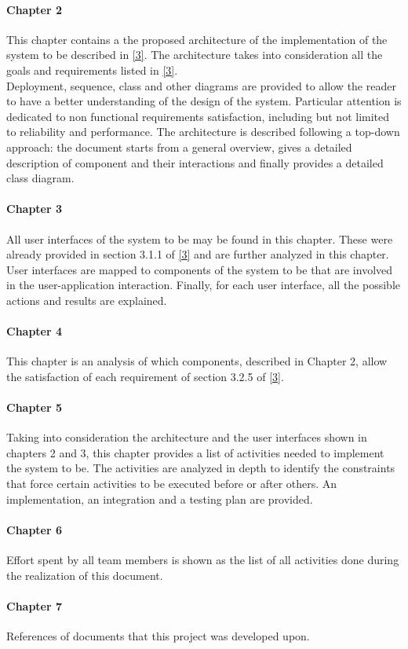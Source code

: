 \documentclass[../DD.tex]{subfiles}
\begin{document}
		\paragraph{Chapter 2}
			This chapter contains a the proposed architecture of the implementation of the system to be described in \hyperref[ref:3]{[3]}. The architecture takes into consideration all the goals and requirements listed in \hyperref[ref:3]{[3]}.\\
			Deployment, sequence, class and other diagrams are provided to allow the reader to have a better understanding of the design of the system. Particular attention is dedicated to non functional requirements satisfaction, including but not limited to reliability and performance. The architecture is described following a top-down approach: the document starts from a general overview, gives a detailed description of component and their interactions and finally provides a detailed class diagram.
		\paragraph{Chapter 3}
			All user interfaces of the system to be may be found in this chapter. These were already provided in section 3.1.1 of \hyperref[ref:3]{[3]} and are further analyzed in this chapter. User interfaces are mapped to components of the system to be that are involved in the user-application interaction. Finally, for each user interface, all the possible actions and results are explained. 
		\paragraph{Chapter 4}
			This chapter is an analysis of which components, described in Chapter 2, allow the satisfaction of each requirement of section 3.2.5 of \hyperref[ref:3]{[3]}. 
		\paragraph{Chapter 5}
			Taking into consideration the architecture and the user interfaces shown in chapters 2 and 3, this chapter provides a list of activities needed to implement the system to be. The activities are analyzed in depth to identify the constraints that force certain activities to be executed before or after others. An implementation, an integration and a testing plan are provided.
		\paragraph{Chapter 6}
			Effort spent by all team members is shown as the list of all activities done during the realization of this document.
		\paragraph{Chapter 7}
			References of documents that this project was developed upon.
		
\end{document}

